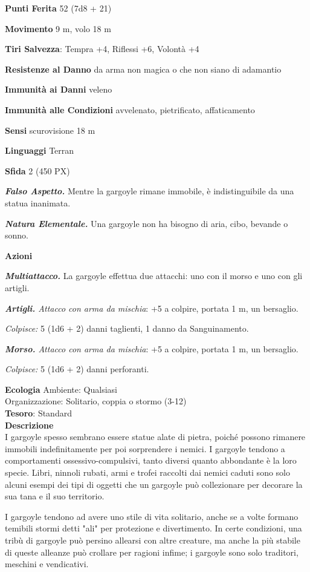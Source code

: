 \begin{multicols}{2}
\textbf{Punti Ferita} 52 (7d8 + 21)

\textbf{Movimento} 9 m, volo 18 m

\textbf{Tiri Salvezza}: Tempra +4, Riflessi +6, Volontà +4

\textbf{Resistenze al Danno} da arma non magica o che non siano di adamantio

\textbf{Immunità ai Danni} veleno

\textbf{Immunità alle Condizioni} avvelenato, pietrificato, affaticamento

\textbf{Sensi} scurovisione 18 m

\textbf{Linguaggi} Terran

\textbf{Sfida} 2 (450 PX)

\textit{\textbf{Falso Aspetto.}} Mentre la gargoyle rimane immobile, è indistinguibile da una statua inanimata.

\textit{\textbf{Natura Elementale.}} Una gargoyle non ha bisogno di aria, cibo, bevande o sonno.

\textbf{Azioni}

\textit{\textbf{Multiattacco.}} La gargoyle effettua due attacchi: uno con il morso e uno con gli artigli.

\textit{\textbf{Artigli.} Attacco con arma da mischia}: +5 a colpire, portata 1 m, un bersaglio.

\textit{Colpisce:} 5 (1d6 + 2) danni taglienti, 1 danno da Sanguinamento.

\textit{\textbf{Morso.} Attacco con arma da mischia}: +5 a colpire, portata 1 m, un bersaglio.

\textit{Colpisce:} 5 (1d6 + 2) danni perforanti.

\textbf{Ecologia}
Ambiente: Qualsiasi\\
Organizzazione: Solitario, coppia o stormo (3-12)\\
\textbf{Tesoro}: Standard\\
\textbf{Descrizione}\\
I gargoyle spesso sembrano essere statue alate di pietra, poiché possono rimanere immobili indefinitamente per poi sorprendere i nemici. I gargoyle tendono a comportamenti ossessivo-compulsivi, tanto diversi quanto abbondante è la loro specie. Libri, ninnoli rubati, armi e trofei raccolti dai nemici caduti sono solo alcuni esempi dei tipi di oggetti che un gargoyle può collezionare per decorare la sua tana e il suo territorio.

I gargoyle tendono ad avere uno stile di vita solitario, anche se a volte formano temibili stormi detti "ali" per protezione e divertimento. In certe condizioni, una tribù di gargoyle può persino allearsi con altre creature, ma anche la più stabile di queste alleanze può crollare per ragioni infime; i gargoyle sono solo traditori, meschini e vendicativi.


\end{multicols}
